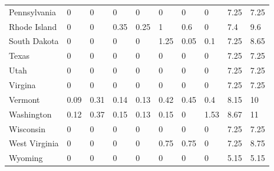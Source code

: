 \begin{table}[H]
{\begin{tabular}{@{}llllllllll@{}}
            Pennsylvania   & 0    & 0    & 0     & 0    & 0    & 0    & 0    & 7.25     & 7.25   \\
            Rhode Island   & 0    & 0    & 0.35  & 0.25 & 1    & 0.6  & 0    & 7.4      & 9.6    \\
            South Dakota   & 0    & 0    & 0     & 0    & 1.25 & 0.05 & 0.1  & 7.25     & 8.65   \\
            Texas          & 0    & 0    & 0     & 0    & 0    & 0    & 0    & 7.25     & 7.25   \\
            Utah           & 0    & 0    & 0     & 0    & 0    & 0    & 0    & 7.25     & 7.25   \\
            Virgina        & 0    & 0    & 0     & 0    & 0    & 0    & 0    & 7.25     & 7.25   \\
            Vermont        & 0.09 & 0.31 & 0.14  & 0.13 & 0.42 & 0.45 & 0.4  & 8.15     & 10     \\
            Washington     & 0.12 & 0.37 & 0.15  & 0.13 & 0.15 & 0    & 1.53 & 8.67     & 11     \\
            Wisconsin      & 0    & 0    & 0     & 0    & 0    & 0    & 0    & 7.25     & 7.25   \\
            West Virginia  & 0    & 0    & 0     & 0    & 0.75 & 0.75 & 0    & 7.25     & 8.75   \\
            Wyoming        & 0    & 0    & 0     & 0    & 0    & 0    & 0    & 5.15     & 5.15   \\ \bottomrule\bottomrule
        \end{tabular}%
    }

\end{table}